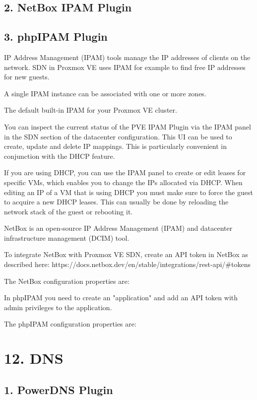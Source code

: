 \subsection{2. NetBox IPAM Plugin}

\subsection{3. phpIPAM Plugin}

IP Address Management (IPAM) tools manage the IP addresses of clients on the network. SDN in Proxmox VE uses IPAM for example to find free IP addresses for new guests.

A single IPAM instance can be associated with one or more zones.

The default built-in IPAM for your Proxmox VE cluster.

You can inspect the current status of the PVE IPAM Plugin via the IPAM panel in the SDN section of the datacenter configuration. This UI can be used to create, update and delete IP mappings. This is particularly convenient in conjunction with the DHCP feature.

If you are using DHCP, you can use the IPAM panel to create or edit leases for specific VMs, which enables you to change the IPs allocated via DHCP. When editing an IP of a VM that is using DHCP you must make sure to force the guest to acquire a new DHCP leases. This can usually be done by reloading the network stack of the guest or rebooting it.

NetBox is an open-source IP Address Management (IPAM) and datacenter infrastructure management (DCIM) tool.

To integrate NetBox with Proxmox VE SDN, create an API token in NetBox as described here: https://docs.netbox.dev/en/stable/integrations/rest-api/#tokens

The NetBox configuration properties are:

In phpIPAM you need to create an "application" and add an API token with admin privileges to the application.

The phpIPAM configuration properties are:


\section{12. DNS}

\subsection{1. PowerDNS Plugin}

